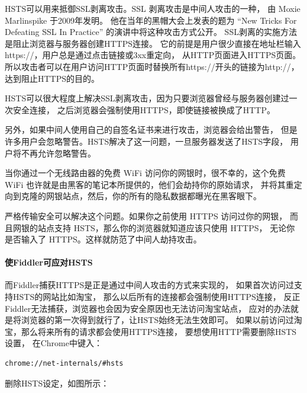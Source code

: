 \documentclass{book}
\begin{document}
HSTS可以用来抵御SSL剥离攻击。SSL 剥离攻击是中间人攻击的一种，
由 Moxie Marlinspike 于2009年发明。
他在当年的黑帽大会上发表的题为 “New Tricks For Defeating SSL In Practice” 的演讲中将这种攻击方式公开。
SSL剥离的实施方法是阻止浏览器与服务器创建HTTPS连接。
它的前提是用户很少直接在地址栏输入https://，用户总是通过点击链接或3xx重定向，
从HTTP页面进入HTTPS页面。所以攻击者可以在用户访问HTTP页面时替换所有https://开头的链接为http://，
达到阻止HTTPS的目的。

HSTS可以很大程度上解决SSL剥离攻击，因为只要浏览器曾经与服务器创建过一次安全连接，
之后浏览器会强制使用HTTPS，即使链接被换成了HTTP。

另外，如果中间人使用自己的自签名证书来进行攻击，浏览器会给出警告，
但是许多用户会忽略警告。HSTS解决了这一问题，一旦服务器发送了HSTS字段，
用户将不再允许忽略警告。

当你通过一个无线路由器的免费 WiFi 访问你的网银时，很不幸的，这个免费 WiFi 也许就是由黑客的笔记本所提供的，他们会劫持你的原始请求，
并将其重定向到克隆的网银站点，然后，你的所有的隐私数据都曝光在黑客眼下。

严格传输安全可以解决这个问题。如果你之前使用 HTTPS 访问过你的网银，
而且网银的站点支持 HSTS，那么你的浏览器就知道应该只使用 HTTPS，
无论你是否输入了 HTTPS。这样就防范了中间人劫持攻击。

\paragraph{使Fiddler可应对HSTS} 而Fiddler捕获HTTPS是正是通过中间人攻击的方式来实现的，
如果首次访问过支持HSTS的网站比如淘宝，
那么以后所有的连接都会强制使用HTTPS连接，
反正Fiddler无法捕获，浏览器也会因为安全原因也无法访问淘宝站点，
应对的办法就是将浏览器的第一次得到就行了，让HSTS始终无法生效即可。
如果以前访问过淘宝，那么将来所有的请求都会使用HTTPS连接，
要想使用HTTP需要删除HSTS设置，
在Chrome中键入：

\begin{lstlisting}[language=HTML]
chrome://net-internals/#hsts
\end{lstlisting}

删除HSTS设定，如图所示：
\end{document}
